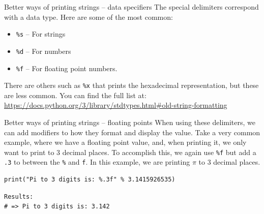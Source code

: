 \documentclass[10pt]{beamer}
\begin{document}
\begin{frame}[label={sec:org2fdcd2f},fragile]{Better ways of printing strings -- data specifiers}
 The special delimiters correspond with a data type. Here are some of the most common:

\begin{itemize}
\item \texttt{\%s} -- For strings
\item \texttt{\%d} -- For numbers
\item \texttt{\%f} -- For floating point numbers.
\end{itemize}

There are others such as \texttt{\%x} that prints the hexadecimal representation, but these are
less common. You can find the full list at: \url{https://docs.python.org/3/library/stdtypes.html\#old-string-formatting}
\end{frame}

\begin{frame}[label={sec:orge1b6018},fragile]{Better ways of printing strings -- floating points}
 When using these delimiters, we can add modifiers to how they format and display the
value. Take a very common example, where we have a floating point value, and, when
printing it, we only want to print to 3 decimal places. To accomplish this, we again
use \texttt{\%f} but add a \texttt{.3} to between the \texttt{\%} and \texttt{f}. In this example, we are printing \(\pi\) to 3
decimal places.

\begin{verbatim}
print("Pi to 3 digits is: %.3f" % 3.1415926535)
\end{verbatim}

\begin{verbatim}
Results: 
# => Pi to 3 digits is: 3.142
\end{verbatim}
\end{frame}
\end{document}
